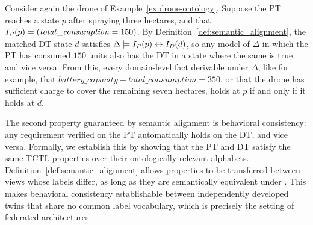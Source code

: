 
\begin{example}
    Consider again the drone of Example~\ref{ex:drone-ontology}.
    Suppose the PT reaches a state $p$ after
spraying three hectares, and that
$I_{\mathit{P}}(p) = (\mathit{total\_consumption} = 150)$.
By Definition~\ref{def:semantic_alignment}, the matched DT state
$d$ satisfies
$\Delta \models I_{\mathit{P}}(p) \leftrightarrow
I_{\mathit{D}}(d)$, so any model of $\Delta$ in which the
PT has consumed $150$ units also has the DT in a state where the
same is true, and vice versa. From this, every domain-level fact
derivable under $\Delta$, like for example, that
$\mathit{battery\_capacity} - \mathit{total\_consumption} = 350$,
or that the drone has sufficient charge to cover the remaining seven
hectares, holds at $p$ if and only if it holds at $d$. %
\end{example}



The second property guaranteed by semantic alignment is behavioral consistency: any requirement verified on the PT automatically holds on the DT, and vice versa. Formally, we establish this by showing that the PT and DT satisfy the same TCTL properties over their ontologically relevant alphabets. Definition~\ref{def:semantic_alignment} allows properties to be transferred between views whose labels differ, as long as they are semantically equivalent under \DomainKnowledge. This makes behavioral consistency establishable between independently developed twins that share no common label vocabulary, which is precisely the setting of federated architectures.


